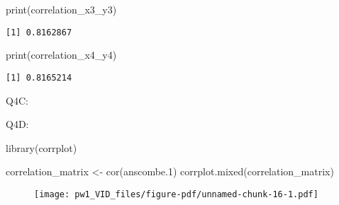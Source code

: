 \documentclass[
  letterpaper,
  DIV=11,
  numbers=noendperiod]{scrartcl}
\newenvironment{Shaded}{}{}
\newcommand{\AttributeTok}[1]{\textcolor[rgb]{0.84,0.23,0.29}{#1}}
\newcommand{\FloatTok}[1]{\textcolor[rgb]{0.00,0.36,0.77}{#1}}
\newcommand{\FunctionTok}[1]{\textcolor[rgb]{0.44,0.26,0.76}{#1}}
\newcommand{\NormalTok}[1]{\textcolor[rgb]{0.14,0.16,0.18}{#1}}
\newcommand{\OtherTok}[1]{\textcolor[rgb]{0.44,0.26,0.76}{#1}}
\newcommand{\SpecialCharTok}[1]{\textcolor[rgb]{0.00,0.36,0.77}{#1}}
\begin{document}
\begin{Shaded}
\begin{Highlighting}[]
\FunctionTok{print}\NormalTok{(correlation\_x3\_y3)}
\end{Highlighting}
\end{Shaded}

\begin{verbatim}
[1] 0.8162867
\end{verbatim}

\begin{Shaded}
\begin{Highlighting}[]
\FunctionTok{print}\NormalTok{(correlation\_x4\_y4)}
\end{Highlighting}
\end{Shaded}

\begin{verbatim}
[1] 0.8165214
\end{verbatim}

Q4C:

\begin{Shaded}
\end{Shaded}

Q4D:

\begin{Shaded}
\begin{Highlighting}[]
\FunctionTok{library}\NormalTok{(corrplot)}

\NormalTok{correlation\_matrix }\OtherTok{\textless{}{-}} \FunctionTok{cor}\NormalTok{(anscombe}\FloatTok{.1}\NormalTok{)}
\FunctionTok{corrplot.mixed}\NormalTok{(correlation\_matrix)}
\end{Highlighting}
\end{Shaded}

\begin{figure}[H]

{\centering \texttt{[image: pw1\_VID\_files/figure-pdf/unnamed-chunk-16-1.pdf]}

}

\end{figure}
\end{document}
